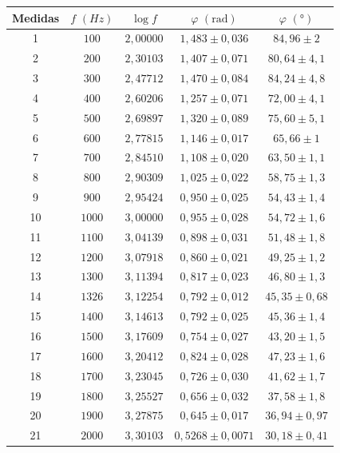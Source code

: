 \documentclass[11pt]{report}
\begin{document}
\begin{refsection}
\begin{table}[H]
\centering
\begin{tabular}{|c|c|c|c|c|}
\hline
Medidas & $f \hspace{4pt}(Hz)$ & $\log f$ & $\varphi \hspace{4pt} (\unit{\radian})$ & $\varphi \hspace{4pt} (\unit{\degree})$\\
\hline
1 & $100$ & $2,00000$ & $1,483 \pm 0,036$ & $84,96 \pm 2$ \\
2 & $200$ & $2,30103$ & $1,407 \pm 0,071$ & $80,64 \pm 4,1$ \\
3 & $300$ & $2,47712$ & $1,470 \pm 0,084$ & $84,24 \pm 4,8$ \\
4 & $400$ & $2,60206$ & $1,257 \pm 0,071$ & $72,00 \pm 4,1$ \\
5 & $500$ & $2,69897$ & $1,320 \pm 0,089$ & $75,60 \pm 5,1$ \\
6 & $600$ & $2,77815$ & $1,146 \pm 0,017$ & $65,66 \pm 1$ \\
7 & $700$ & $2,84510$ & $1,108 \pm 0,020$ & $63,50 \pm 1,1$ \\
8 & $800$ & $2,90309$ & $1,025 \pm 0,022$ & $58,75 \pm 1,3$ \\
9 & $900$ & $2,95424$ & $0,950 \pm 0,025$ & $54,43 \pm 1,4$ \\
10 & $1000$ & $3,00000$ & $0,955 \pm 0,028$ & $54,72 \pm 1,6$ \\
11 & $1100$ & $3,04139$ & $0,898 \pm 0,031$ & $51,48 \pm 1,8$ \\
12 & $1200$ & $3,07918$ & $0,860 \pm 0,021$ & $49,25 \pm 1,2$ \\
13 & $1300$ & $3,11394$ & $0,817 \pm 0,023$ & $46,80 \pm 1,3$ \\
14 & $1326$ & $3,12254$ & $0,792 \pm 0,012$ & $45,35 \pm 0,68$ \\
15 & $1400$ & $3,14613$ & $0,792 \pm 0,025$ & $45,36 \pm 1,4$ \\
16 & $1500$ & $3,17609$ & $0,754 \pm 0,027$ & $43,20 \pm 1,5$ \\
17 & $1600$ & $3,20412$ & $0,824 \pm 0,028$ & $47,23 \pm 1,6$ \\
18 & $1700$ & $3,23045$ & $0,726 \pm 0,030$ & $41,62 \pm 1,7$ \\
19 & $1800$ & $3,25527$ & $0,656 \pm 0,032$ & $37,58 \pm 1,8$ \\
20 & $1900$ & $3,27875$ & $0,645 \pm 0,017$ & $36,94 \pm 0,97$ \\
21 & $2000$ & $3,30103$ & $0,5268 \pm 0,0071$ & $30,18 \pm 0,41$ \\

\end{tabular}
\end{table}
\end{refsection}
\end{document}
